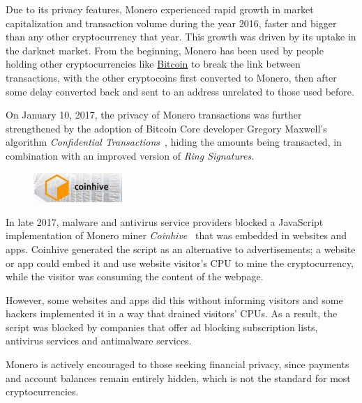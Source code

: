 Due to its privacy features, Monero experienced rapid growth in market capitalization and transaction volume during the year 2016, faster and bigger than any other cryptocurrency that year. This growth was driven by its uptake in the darknet market. From the beginning, Monero has been used by people holding other cryptocurrencies like \hyperref[sec:Bitcoin]{Bitcoin} to break the link between transactions, with the other cryptocoins first converted to Monero, then after some delay converted back and sent to an address unrelated to those used before.

On January 10, 2017, the privacy of Monero transactions was further strengthened by the adoption of Bitcoin Core developer Gregory Maxwell's algorithm \emph{Confidential Transactions}~\cite{ringCT}, hiding the amounts being transacted, in combination with an improved version of \emph{Ring Signatures}.

\begin{figure}
\centering
\includegraphics[width=0.3\textwidth]{Images/Monero/coinhive.jpg}
\end{figure}
In late 2017, malware and antivirus service providers blocked a JavaScript implementation of Monero miner \emph{Coinhive}~\cite{coinhive} that was embedded in websites and apps. Coinhive generated the script as an alternative to advertisements; a website or app could embed it and use website visitor's CPU to mine the cryptocurrency, while the visitor was consuming the content of the webpage.

However, some websites and apps did this without informing visitors and some hackers implemented it in a way that drained visitors' CPUs. As a result, the script was blocked by companies that offer ad blocking subscription lists, antivirus services and antimalware services.

Monero is actively encouraged to those seeking financial privacy, since payments and account balances remain entirely hidden, which is not the standard for most cryptocurrencies.

